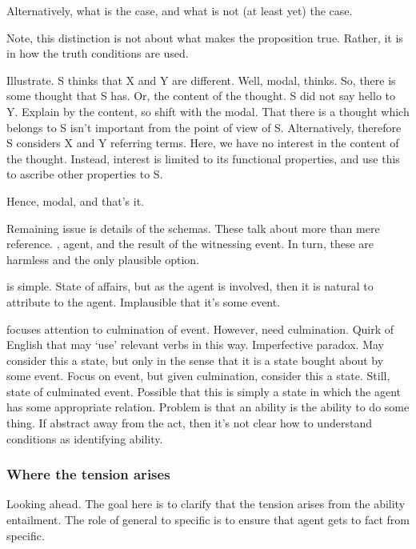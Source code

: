 \begin{note}
  Alternatively, what is the case, and what is not (at least yet) the case.

  Note, this distinction is not about what makes the proposition true.
  Rather, it is in how the truth conditions are used.

  Illustrate.
  S thinks that X and Y are different.
  Well, modal, thinks.
  So, there is some thought that S has.
  Or, the content of the thought.
  S did not say hello to Y.
  Explain by the content, so shift with the modal.
  That there is a thought which belongs to S isn't important from the point of view of S.
  Alternatively, therefore S considers X and Y referring terms.
  Here, we have no interest in the content of the thought.
  Instead, interest is limited to its functional properties, and use this to ascribe other properties to S.

  Hence, modal, and that's it.

  Remaining issue is details of the schemas.
  These talk about more than mere reference.
  \AR{}, agent, and \WR{} the result of the witnessing event.
  In turn, these are harmless and the only plausible option.

  \AR{} is simple.
  State of affairs, but as the agent is involved, then it is natural to attribute to the agent.
  Implausible that it's some event.

  \WR{} focuses attention to culmination of event.
  However, need culmination.
  Quirk of English that may `use' relevant verbs in this way.
  Imperfective paradox.
  May consider this a state, but only in the sense that it is a state bought about by some event.
  Focus on event, but given culmination, consider this a state.
  Still, state of culminated event.
  Possible that this is simply a state in which the agent has some appropriate relation.
  Problem is that an ability is the ability to do some thing.
  If abstract away from the act, then it's not clear how to understand conditions as identifying ability.
\end{note}

\subsubsection{Where the tension arises}
\label{sec:where-tension-arises}

\begin{note}
  {
    \color{red}
    Looking ahead.
  }
  The goal here is to clarify that the tension arises from the ability entailment.
  The role of general to specific is to ensure that agent gets to fact from specific.
\end{note}



